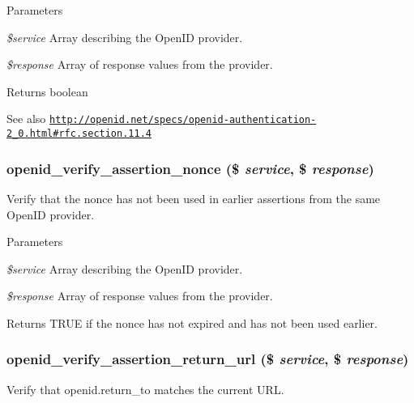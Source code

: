 \begin{DoxyParams}{Parameters}
\item[{\em \$service}]Array describing the OpenID provider. \item[{\em \$response}]Array of response values from the provider.\end{DoxyParams}
\begin{DoxyReturn}{Returns}
boolean 
\end{DoxyReturn}
\begin{DoxySeeAlso}{See also}
\href{http://openid.net/specs/openid-authentication-2_0.html#rfc.section.11.4}{\tt http://openid.net/specs/openid-\/authentication-\/2\_\-0.html\#rfc.section.11.4} 
\end{DoxySeeAlso}
\hypertarget{openid_8module_adc4a4bdf953124a14a6265264f70ca2e}{
\subsubsection[{openid\_\-verify\_\-assertion\_\-nonce}]{\setlength{\rightskip}{0pt plus 5cm}openid\_\-verify\_\-assertion\_\-nonce (\$ {\em service}, \/  \$ {\em response})}}
\label{openid_8module_adc4a4bdf953124a14a6265264f70ca2e}
Verify that the nonce has not been used in earlier assertions from the same OpenID provider.


\begin{DoxyParams}{Parameters}
\item[{\em \$service}]Array describing the OpenID provider. \item[{\em \$response}]Array of response values from the provider.\end{DoxyParams}
\begin{DoxyReturn}{Returns}
TRUE if the nonce has not expired and has not been used earlier. 
\end{DoxyReturn}
\hypertarget{openid_8module_a523fa00a214374d55f9748c489b2180b}{
\subsubsection[{openid\_\-verify\_\-assertion\_\-return\_\-url}]{\setlength{\rightskip}{0pt plus 5cm}openid\_\-verify\_\-assertion\_\-return\_\-url (\$ {\em service}, \/  \$ {\em response})}}
\label{openid_8module_a523fa00a214374d55f9748c489b2180b}
Verify that openid.return\_\-to matches the current URL.

